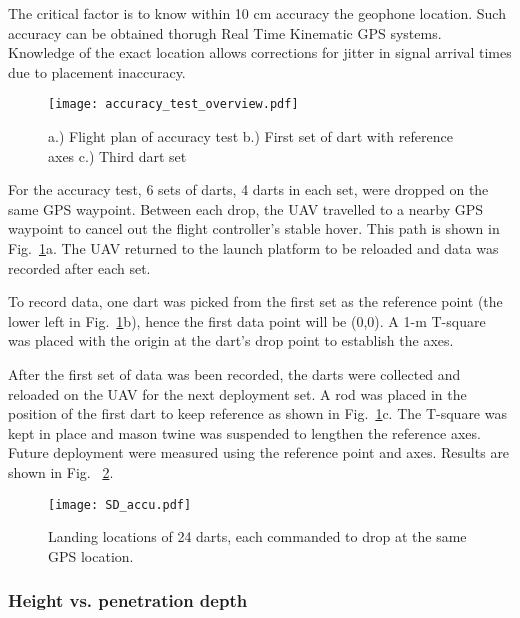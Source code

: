 The critical factor is to know within 10 cm accuracy the geophone location.  Such accuracy can be obtained thorugh Real Time Kinematic GPS systems. Knowledge of the exact location allows corrections for jitter in signal arrival times due to  placement inaccuracy.


\begin{figure} \centering
  {\texttt{[image: accuracy\_test\_overview.pdf]}}
 \caption{a.) Flight plan of accuracy test b.) First set of dart with reference axes c.) Third dart set } 
 \label{fig:Accu_test_darts}
\end{figure}

For the accuracy test, 6 sets of darts, 4 darts in each set, were dropped on the same GPS waypoint. Between each drop, the UAV travelled to a nearby GPS waypoint to cancel out the flight controller's stable hover.  This path is shown in Fig.~\ref{fig:Accu_test_darts}a. The UAV returned to the launch platform to be reloaded and data was recorded after each set.

To record data, one dart was picked from the first set as the reference point (the lower left in Fig.~\ref{fig:Accu_test_darts}b), hence the first data point will be (0,0). A 1-m T-square was placed with the origin at the dart's drop point to establish the axes.

After the first set of data was been recorded, the darts were collected and reloaded on the UAV for the next deployment set.
 A rod was placed in the position of the first dart to keep reference as shown in Fig.~\ref{fig:Accu_test_darts}c. 
 The T-square was kept in place and mason twine was suspended to lengthen the reference axes. 
 Future deployment were measured  using the reference point and axes. Results are shown in Fig.~ \ref{fig:SD_accu.pdf}.


\begin{figure} \centering
  {\texttt{[image: SD\_accu.pdf]}}
 \caption{Landing locations of 24 darts, each commanded to drop at the same GPS location. 
 \label{fig:SD_accu.pdf}}
\end{figure}


\subsubsection{Height vs. penetration depth}

